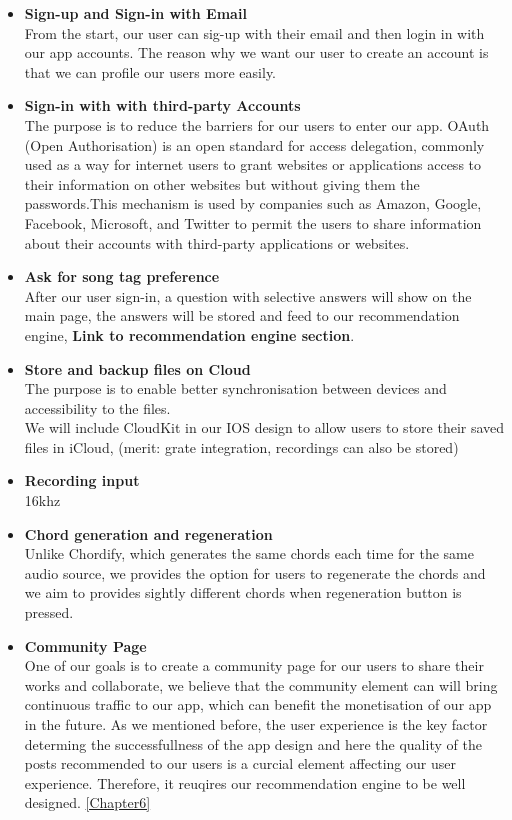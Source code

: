 \begin{itemize}

\item \textbf{Sign-up and Sign-in with Email}
\\From the start, our user can sig-up with their email and then login in with our app accounts. The reason why we want our user to create an account is that we can profile our users more easily.

\item \textbf{Sign-in with with third-party Accounts}
\\ The purpose is to reduce the barriers for our users to enter our app. OAuth (Open Authorisation) is an open standard for access delegation, commonly used as a way for internet users to grant websites or applications access to their information on other websites but without giving them the passwords.This mechanism is used by companies such as Amazon, Google, Facebook, Microsoft, and Twitter to permit the users to share information about their accounts with third-party applications or websites.

\item \textbf{Ask for song tag preference}
\\After our user sign-in, a question with selective answers will show on the main page, the answers will be stored and feed to our recommendation engine, \textbf{Link to recommendation engine section}.

\item \textbf{Store and backup files on Cloud}
\\The purpose is to enable better synchronisation between devices and accessibility to the files. 
\\We will include CloudKit in our IOS design to allow users to store their saved files in iCloud, (merit: grate integration, recordings can also be stored)

\item \textbf{Recording input}
\\ 16khz

\item \textbf{Chord generation and regeneration}
\\Unlike Chordify, which generates the same chords each time for the same audio source, we provides the option for users to regenerate the chords and we aim to provides sightly different chords when regeneration button is pressed.

\item \textbf{Community Page}
\\One of our goals is to create a community page for our users to share their works and collaborate, we believe that the community element can will bring continuous traffic to our app, which can benefit the monetisation of our app in the future.
As we mentioned before, the user experience is the key factor determing the successfullness of the app design and here the quality of the posts recommended to our users is a curcial element affecting our user experience. 
Therefore, it reuqires our recommendation engine to be well designed. \autoref{Chapter6}


\end{itemize}
